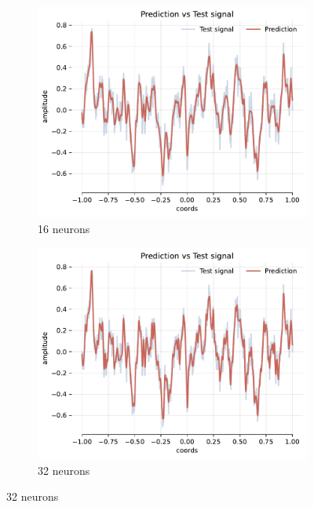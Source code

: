 \begin{figure}[!h]
    \centering
    \begin{subfigure}[b]{0.32\textwidth}
        \centering
        \includegraphics[width=\textwidth]{img/ch4/pred-noise-1hl-16hf-w8.pdf}
        \caption{16 neurons}
        \label{fig:pred-noise-1hl-16hf-w8}
    \end{subfigure}
    \begin{subfigure}[b]{0.32\textwidth}
        \centering
        \includegraphics[width=\textwidth]{img/ch4/pred-noise-1hl-32hf-w8.pdf}
        \caption{32 neurons}
        \label{fig:comp-pred-noise-1hl-32hf-w8}
    \end{subfigure}

\end{figure}

